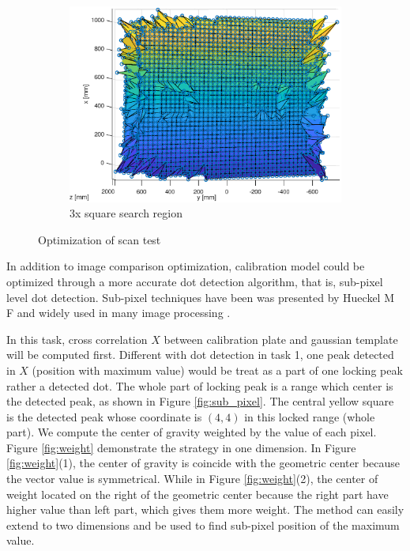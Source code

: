 \begin{figure}[h!]
\begin{subfigure}[t]{0.3\linewidth}
		\includegraphics[width=1\linewidth]{figures/part2/scan3}
		\caption{3x square search region}
		\label{fig:scan_op_c}
	\end{subfigure}
	\caption{Optimization of scan test}
	\label{fig:scan_op}
\end{figure}

In addition to image comparison optimization, calibration model could be optimized through a more accurate dot detection algorithm, that is, sub-pixel level dot detection. Sub-pixel techniques have been was presented by Hueckel M F\cite{Hueckel1973A} and widely used in many image processing \cite{Avrahami1991Sub}\cite{Haskett2001Ares}\cite{Huertas2009Detection}. 

In this task, cross correlation $X$ between calibration plate and gaussian template will be computed first. Different with dot detection in task 1, one peak detected in $X$ (position with maximum value) would be treat as a part of one locking peak rather a detected dot. The whole part of locking peak is a range which center is the detected peak, as shown in Figure \ref{fig:sub_pixel}. The central yellow square is the detected peak whose coordinate is $(4,4)$ in this locked range (whole part). We compute the center of gravity weighted by the value of each pixel. Figure \ref{fig:weight} demonstrate the strategy in one dimension.  In Figure \ref{fig:weight}(1), the center of gravity is coincide with the geometric center because the vector value is symmetrical. While in Figure \ref{fig:weight}(2), the center of weight located on the right of the geometric center because the right part have higher value than left part, which gives them more weight. The method can easily extend to two dimensions and be used to find sub-pixel position of the maximum value.

